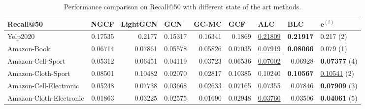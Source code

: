 \begin{table*}[h!]
    \centering
    \begin{tabular}{|l|r|r|r|r|r||r|r|l|}
        \hline
        Recall@50               & \multicolumn{1}{l|}{NGCF} & \multicolumn{1}{l|}{LightGCN} & \multicolumn{1}{l|}{GCN} & \multicolumn{1}{l|}{GC-MC} & \multicolumn{1}{l||}{GCF} & \multicolumn{1}{l|}{ALC} & \multicolumn{1}{l|}{BLC} & $\mathbf{e}^{(i)}$      \\ \hline
        Yelp2020                & 0.17535                   & 0.2177                        & 0.15317                  & 0.16341                    & 0.1869                    & \underline{0.21809}      & \textbf{0.21917}         & 0.217 (2)               \\ \hline
        Amazon-Book             & 0.06714                   & 0.07861                       & 0.05578                  & 0.05826                    & 0.07035                   & \underline{0.07919}      & \textbf{0.08066}         & 0.079 (1)               \\ \hline
        Amazon-Cell-Sport       & 0.05312                   & 0.06451                       & 0.04119                  & 0.03723                    & 0.06536                   & \underline{0.07002}      & 0.06928                  & \textbf{0.07377} (4)    \\ \hline
        Amazon-Cloth-Sport      & 0.08501                   & 0.10482                       & 0.02070                  & 0.02817                    & 0.10385                   & 0.10240                  & \textbf{0.10567}         & \underline{0.10541} (2) \\ \hline
        Amazon-Cell-Electronic  & 0.05248                   & 0.07738                       & 0.03668                  & 0.02633                    & 0.07165                   & 0.07355                  & \underline{0.07846}      & \textbf{0.07909} (3)    \\ \hline
        Amazon-Cloth-Electronic & 0.01863                   & 0.03225                       & 0.02575                  & 0.01690                    & 0.02948                   & \underline{0.03760}      & 0.03506                  & \textbf{0.04061} (5)    \\ \hline
    \end{tabular}
    \caption{Performance comparison on Recall@50 with different state of the art methods.}
    \label{tab:baselines-recall}
\end{table*}
